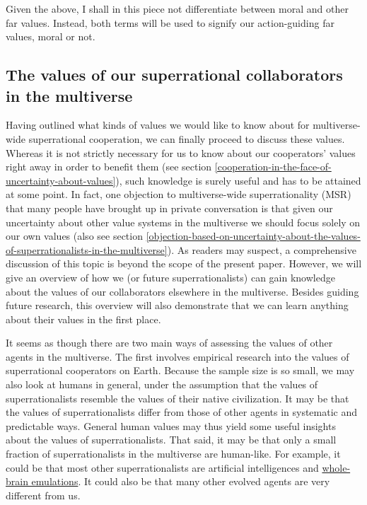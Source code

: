 Given the above, I shall in this piece not differentiate between moral
and other far values. Instead, both terms will be used to signify our
action-guiding far values, moral or not.

\hypertarget{the-values-of-our-superrational-collaborators-in-the-multiverse}{\subsection{The
values of our superrational collaborators in the
multiverse}\label{the-values-of-our-superrational-collaborators-in-the-multiverse}}

Having outlined what kinds of values we would like to know about for
multiverse-wide superrational cooperation, we can finally proceed to
discuss these values. Whereas it is not strictly necessary for us to
know about our cooperators' values right away in order to benefit them
(see section
\ref{cooperation-in-the-face-of-uncertainty-about-values}), such
knowledge is surely useful and has to be attained at some point. In
fact, one objection to multiverse-wide superrationality (MSR) that many
people have brought up in private conversation is that given our
uncertainty about other value systems in the multiverse we should focus
solely on our own values (also see section
\ref{objection-based-on-uncertainty-about-the-values-of-superrationalists-in-the-multiverse}). As readers may suspect, a comprehensive discussion of
this topic is beyond the scope of the present paper. However, we will
give an overview of how we (or future superrationalists) can gain
knowledge about the values of our collaborators elsewhere in the
multiverse. Besides guiding future research, this overview will also
demonstrate that we can learn anything about their values in the first
place.

It seems as though there are two main ways of assessing the values of
other agents in the multiverse. The first involves empirical research
into the values of superrational cooperators on Earth. Because the
sample size is so small, we may also look at humans in general, under
the assumption that the values of superrationalists resemble the values
of their native civilization. It may be that the values of
superrationalists differ from those of other agents in systematic and
predictable ways. General human values may thus yield some useful
insights about the values of superrationalists. That said, it may be
that only a small fraction of superrationalists in the multiverse are
human-like. For example, it could be that most other superrationalists
are artificial intelligences and
\href{https://en.wikipedia.org/wiki/Mind_uploading}{whole-brain
emulations}. It could also be that many other evolved agents are very
different from us.

